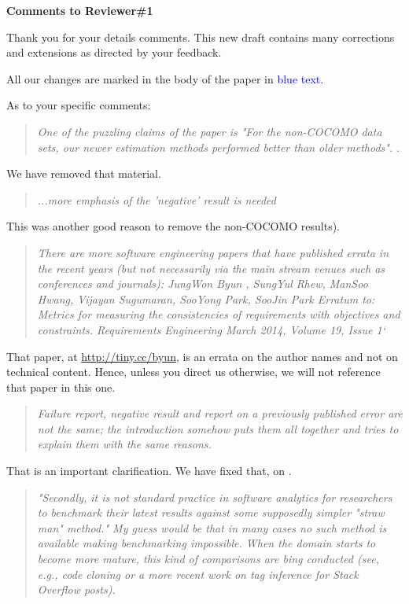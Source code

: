 \noindent
{\bf Comments to Reviewer\#1}

\noindent
Thank you for your details comments.  This new draft
contains many corrections and extensions as directed by your feedback.

All our changes are marked in the body of the paper in \textcolor{blue}{blue text}.
 

As to your specific comments: 
 
\begin{quote}{\em One of the puzzling claims of the paper is "For the non-COCOMO data sets, our newer estimation methods performed better than older methods". }. \end{quote}

\noindent
We have removed
that material.

\begin{quote}{\em ...more emphasis of the 'negative' result is needed}\end{quote}

\noindent
This was another good reason to remove the
non-COCOMO results).

\begin{quote}{\em There are more software engineering papers that have published errata in the recent years (but not necessarily via the main stream venues such as conferences and journals): JungWon Byun , SungYul Rhew, ManSoo Hwang, Vijayan Sugumaran, SooYong Park, SooJin Park Erratum to: Metrics for measuring the consistencies of requirements with objectives and constraints. Requirements Engineering March 2014, Volume 19, Issue 1`}\end{quote}

\noindent
That paper, at \url{http://tiny.cc/byun},
is an errata on the author names
and not on technical content. Hence, unless you direct us otherwise,
we will not reference that paper in this one.

\begin{quote}{\em Failure report, negative result and report on a previously published error are not the same; the introduction somehow puts them all together and tries to explain them with the same reasons.}\end{quote}



\noindent
That is an  important clarification.
We have fixed that, on .

\begin{quote}{\em "Secondly, it is not standard practice in software analytics for researchers to benchmark their latest results against some supposedly simpler "straw man" method." My guess would be that in many cases no such method is available making benchmarking impossible. When the domain starts to become more mature, this kind of comparisons are bing conducted (see, e.g., code cloning or a more recent work on tag inference for Stack Overflow posts).}\end{quote}

